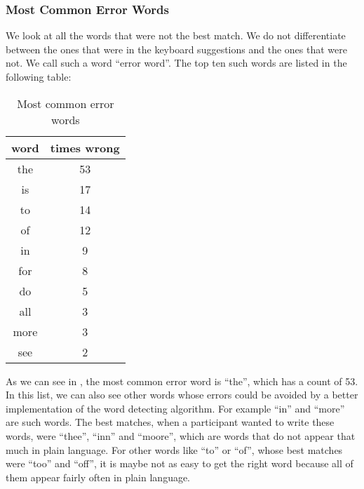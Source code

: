 \subsubsection{Most Common Error Words}
We look at all the words that were not the best match. We do not differentiate between the ones that were in the keyboard suggestions and the ones that were not. We call such a word ``error word''. The top ten such words are listed in the following table:
\begin{table}[H]
    \centering
    \caption{Most common error words}
    \begin{tabular}{cc} \toprule
        word&times wrong\\ \midrule
        the & 53\\
        is & 17\\
        to & 14\\
        of & 12\\
        in & 9\\
        for & 8\\
        do & 5\\
        all & 3\\
        more & 3\\
        see & 2\\
        \bottomrule
    \end{tabular}
    \label{tab:error_words}
\end{table}

As we can see in , the most common error word is ``the'', which has a count of 53. In this list, we can also see other words whose errors could be avoided by a better implementation of the word detecting algorithm. For example ``in'' and ``more'' are such words. The best matches, when a participant wanted to write these words, were ``thee'', ``inn'' and ``moore'', which are words that do not appear that much in plain language. For other words like ``to'' or ``of'', whose best matches were ``too'' and ``off'', it is maybe not as easy to get the right word because all of them appear fairly often in plain language.

